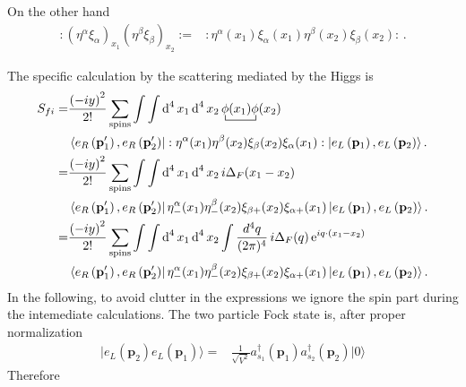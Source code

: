 On the other hand 
\begin{align}
\label{eq:156f}
  :(\eta^{\alpha} \xi_{\alpha})_{x_1}(\eta^{\beta} \xi_{\beta})_{x_2}:=&
:\eta^{\alpha}(x_1) \xi_{\alpha}(x_1) \eta^{\beta}(x_2) \xi_{\beta}(x_2):\,.
\end{align}




The specific calculation by the scattering mediated by the Higgs is 
\begin{align}
  S_{fi}=&\frac{\left( -iy \right)^{2}}{2!}\sum_{\text{spins}}\int\int \operatorname{d}^4x_1 \operatorname{d}^4x_2
\bcontraction{\,}{\phi}{(x_1)}{\phi}\,\phi(x_1)\phi(x_2) \nonumber\\
&\left\langle e_R\left(\mathbf{p}'_1\right), e_R \left(\mathbf{p}'_2\right) \right|
  :\eta^{\alpha}(x_1) \eta^{\beta}(x_2)\xi_{\beta}(x_2) \xi_{\alpha}(x_1):
 \left| e_L \left(\mathbf{p}_1\right), e_L\left(\mathbf{p}_2\right) \right\rangle. \nonumber\\
  =&\frac{\left( -iy \right)^{2}}{2!}\sum_{\text{spins}}\int\int \operatorname{d}^4x_1 \operatorname{d}^4x_2
\,i\Delta_F(x_1-x_2) \nonumber\\
&\left\langle e_R\left(\mathbf{p}'_1\right), e_R \left(\mathbf{p}'_2\right) \right|
  \eta^{\alpha}_{-}(x_1) \eta^{\beta}_{-}(x_2)\xi_{\beta +}(x_2) \xi_{\alpha +}(x_1)
 \left| e_L \left(\mathbf{p}_1\right), e_L\left(\mathbf{p}_2\right) \right\rangle. \nonumber\\
  =&\frac{\left( -iy \right)^{2}}{2!}\sum_{\text{spins}}\int\int \operatorname{d}^4x_1 \operatorname{d}^4x_2
\int\frac{d^4q}{(2\pi)^4}\,i\Delta_F(q)\operatorname{e}^{i q\cdot(x_1-x_2)} \nonumber\\
&\left\langle e_R\left(\mathbf{p}'_1\right), e_R \left(\mathbf{p}'_2\right) \right|
  \eta^{\alpha}_{-}(x_1) \eta^{\beta}_{-}(x_2)\xi_{\beta +}(x_2) \xi_{\alpha +}(x_1)
 \left| e_L \left(\mathbf{p}_1\right), e_L\left(\mathbf{p}_2\right) \right\rangle. 
\end{align}
In the following, to avoid clutter in the expressions we ignore the spin part during the intemediate calculations. 
The two particle Fock state is, after proper normalization
\begin{align}
  |e_L(\mathbf{p}_2)e_L(\mathbf{p}_1)\rangle=&\frac{1}{\sqrt{V^2}}a_{s_1}^\dagger(\mathbf{p}_1)a_{s_2}^\dagger(\mathbf{p}_2)|0\rangle
\end{align}
Therefore %
